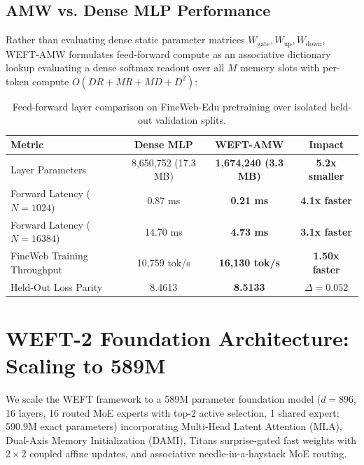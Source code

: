 \documentclass[11pt,a4paper]{article}
\begin{document}
\subsection{AMW vs. Dense MLP Performance}
Rather than evaluating dense static parameter matrices $W_{\text{gate}}, W_{\text{up}}, W_{\text{down}}$, WEFT-AMW formulates feed-forward compute as an associative dictionary lookup evaluating a dense softmax readout over all $M$ memory slots with per-token compute $O(DR + MR + MD + D^2)$:
\begin{table}[h]
\centering
\begin{tabular}{lccc}
\toprule
\textbf{Metric} & \textbf{Dense MLP} & \textbf{WEFT-AMW} & \textbf{Impact} \\
\midrule
Layer Parameters & 8,650,752 (17.3 MB) & \textbf{1,674,240 (3.3 MB)} & \textbf{5.2x smaller} \\
Forward Latency ($N=1024$) & 0.87 ms & \textbf{0.21 ms} & \textbf{4.1x faster} \\
Forward Latency ($N=16384$) & 14.70 ms & \textbf{4.73 ms} & \textbf{3.1x faster} \\
FineWeb Training Throughput & 10,759 tok/s & \textbf{16,130 tok/s} & \textbf{1.50x faster} \\
Held-Out Loss Parity & 8.4613 & \textbf{8.5133} & $\Delta = 0.052$ \\
\bottomrule
\end{tabular}
\caption{Feed-forward layer comparison on FineWeb-Edu pretraining over isolated held-out validation splits.}
\end{table}

\section{WEFT-2 Foundation Architecture: Scaling to 589M}
We scale the WEFT framework to a 589M parameter foundation model ($d=896$, 16 layers, 16 routed MoE experts with top-2 active selection, 1 shared expert; 590.9M exact parameters) incorporating Multi-Head Latent Attention (MLA), Dual-Axis Memory Initialization (DAMI), Titans surprise-gated fast weights with $2\times 2$ coupled affine updates, and associative needle-in-a-haystack MoE routing.
\end{document}

